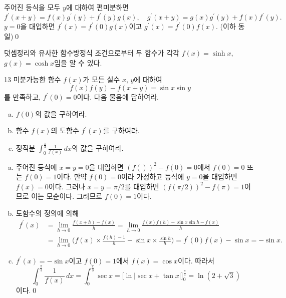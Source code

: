 \documentclass{article}
\begin{document}
\begin{sol}[편미분 풀이]
	주어진 등식을 모두 $y$에 대하여 편미분하면
	\[
		f^\prime(x+y)=f(x)g^\prime(y)+f^\prime(y)g(x),\quad g^\prime(x+y)=g(x)g^\prime(y)+f(x)f^\prime(y).
	\]
	$y=0$을 대입하면 $f^\prime(x)=f^\prime(0)g(x)$이고 $g^\prime(x)=f^\prime(0)f(x)$. (이하 동일)\qed
\end{sol}

\begin{remark}
	덧셈정리와 유사한 함수방정식 조건으로부터 두 함수가 각각 $f(x)=\sinh x$, $g(x)=\cosh x$임을 알 수 있다.
\end{remark}

\newpage
\begin{prob}{}{13}
	미분가능한 함수 $f(x)$가 모든 실수 $x$, $y$에 대하여
	\[
		f(x)f(y)-f(x+y)=\sin x\sin y
	\]
	를 만족하고, $f^\prime(0)=0$이다. 다음 물음에 답하여라.
	\begin{enumerate}[(a)]
		\item $f(0)$의 값을 구하여라.
		\item 함수 $f(x)$의 도함수 $f^\prime(x)$를 구하여라.
		\item 정적분 $\displaystyle\int_0^{\tfrac{\pi}{3}}\frac{1}{f(x)}\,dx$의 값을 구하여라.
	\end{enumerate}
\end{prob}

\begin{sol}[정석 풀이]
	\phantom{}
	\begin{enumerate}[(a)]
		\item 주어진 등식에 $x=y=0$을 대입하면 $(f())^2-f(0)=0$에서 $f(0)=0$ 또는 $f(0)=1$이다. 만약 $f(0)=0$이라 가정하고 등식에 $y=0$을 대입하면 $f(x)=0$이다. 그러나 $x=y=\pi/2$를 대입하면 $(f(\pi/2))^2-f(\pi)=1$이므로 이는 모순이다. 그러므로 $f(0)=1$이다.
		\item 도함수의 정의에 의해
			\begin{align*}
				f^\prime(x)&=\lim\limits_{h\to0}\frac{f(x+h)-f(x)}{h}=\lim\limits_{h\to0}\frac{f(x)f(h)-\sin x\sin h-f(x)}{h}\\[3pt]
				&=\lim\limits_{h\to0}\biggl(f(x)\times\frac{f(h)-1}{h}-\sin x\times\frac{\sin h}{h}\biggr)=f^\prime(0)f(x)-\sin x=-\sin x.
			\end{align*}
		\item $f^\prime(x)=-\sin x$이고 $f(0)=1$에서 $f(x)=\cos x$이다. 따라서
			\[
				\int_0^{\tfrac{\pi}{3}}\frac{1}{f(x)}\,dx=\int_0^{\tfrac{\pi}{3}}\sec x=\biggl[\ln\vert\sec x+\tan x\vert\biggr]_0^{\tfrac{\pi}{3}}=\ln(2+\sqrt3)
			\]
			이다.\qed
	\end{enumerate}
\end{sol}
\end{document}
